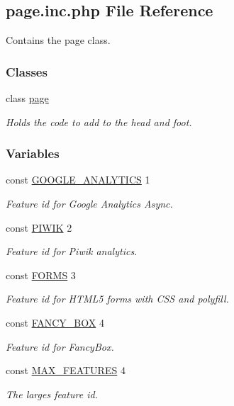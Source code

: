 \hypertarget{page_8inc_8php}{\subsection{page.\-inc.\-php File Reference}
\label{page_8inc_8php}
}


Contains the page class.  


\subsubsection*{Classes}
\begin{DoxyCompactItemize}
\item 
class \hyperlink{classpage}{page}
\begin{DoxyCompactList}\small\item\em Holds the code to add to the head and foot. \end{DoxyCompactList}\end{DoxyCompactItemize}
\subsubsection*{Variables}
\begin{DoxyCompactItemize}
\item 
const \hyperlink{page_8inc_8php_acf6eb59f99bc3d667079a97d04b06a8d}{G\-O\-O\-G\-L\-E\-\_\-\-A\-N\-A\-L\-Y\-T\-I\-C\-S} 1
\begin{DoxyCompactList}\small\item\em Feature id for Google Analytics Async. \end{DoxyCompactList}\item 
const \hyperlink{page_8inc_8php_a0253c636b6a675cb40bfe52b6448970a}{P\-I\-W\-I\-K} 2
\begin{DoxyCompactList}\small\item\em Feature id for Piwik analytics. \end{DoxyCompactList}\item 
const \hyperlink{page_8inc_8php_a3ea935ef7154d72d22c8394a15a1f326}{F\-O\-R\-M\-S} 3
\begin{DoxyCompactList}\small\item\em Feature id for H\-T\-M\-L5 forms with C\-S\-S and polyfill. \end{DoxyCompactList}\item 
const \hyperlink{page_8inc_8php_a229d49a07467652cd3159526ef05dfc7}{F\-A\-N\-C\-Y\-\_\-\-B\-O\-X} 4
\begin{DoxyCompactList}\small\item\em Feature id for Fancy\-Box. \end{DoxyCompactList}\item 
const \hyperlink{page_8inc_8php_a15133b567c1ea5426e5e374d7bf82373}{M\-A\-X\-\_\-\-F\-E\-A\-T\-U\-R\-E\-S} 4
\begin{DoxyCompactList}\small\item\em The larges feature id. \end{DoxyCompactList}\end{DoxyCompactItemize}


